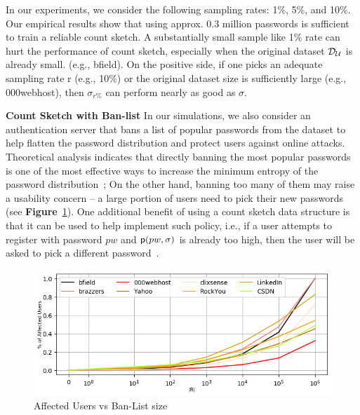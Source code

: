 
In our experiments, we consider the following sampling rates: 1\%, 5\%, and 10\%. Our empirical results show that using approx. 0.3 million passwords is sufficient to train a reliable count sketch. A substantially small sample like 1\% rate can hurt the performance of count sketch, especially when the original dataset $\mathcal{D}_{{\mathcal{U}}}$ is already small. (e.g., bfield). On the positive side, if one picks an adequate sampling rate r (e.g., 10\%) or the original dataset size is sufficiently large (e.g., 000webhost), then $\sigma_{r\%}$ can perform nearly as good as $\sigma$.





\textbf{Count Sketch with Ban-list} In our simulations, we also consider an authentication server that bans a list of popular passwords from the dataset to help flatten the password distribution and protect users against online attacks. Theoretical analysis indicates that directly banning the most popular passwords is one of the most effective ways to increase the minimum entropy of the password distribution~\cite{BKPS:ACMEC13}; On the other hand, banning too many of them may raise a usability concern – a large portion of users need to pick their new passwords (see \textbf{Figure}~\ref{figure: affectedusers}). One additional benefit of using a count sketch data structure is that it can be used to help implement such policy, i.e., if a user attempts to register with password $pw$ and $\textsf{p}(pw,\sigma)$ is already too high, then the user will be asked to pick a different password~\cite{HTS:SchHerMit10}.

\begin{figure}[htb]	
	\begin{center}
		\vspace{-0.4cm}
		\includegraphics[width=0.9\linewidth]{Figures/Experiments/AffectedUsers}
		\vspace{-0.53cm}
		\caption{Affected Users vs Ban-List size}\label{figure: affectedusers}
		\vspace{-0.45cm}
	\end{center}
\end{figure}

